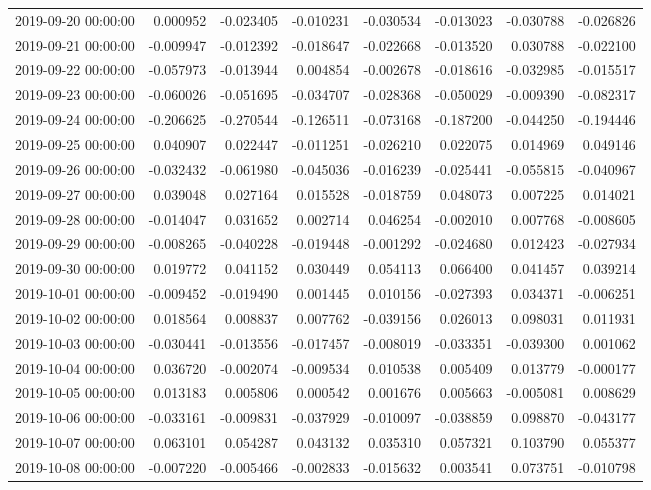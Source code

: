 \begin{tabular}{lrrrrrrr}
2019-09-20 00:00:00 & 0.000952 & -0.023405 & -0.010231 & -0.030534 & -0.013023 & -0.030788 & -0.026826 \\
2019-09-21 00:00:00 & -0.009947 & -0.012392 & -0.018647 & -0.022668 & -0.013520 & 0.030788 & -0.022100 \\
2019-09-22 00:00:00 & -0.057973 & -0.013944 & 0.004854 & -0.002678 & -0.018616 & -0.032985 & -0.015517 \\
2019-09-23 00:00:00 & -0.060026 & -0.051695 & -0.034707 & -0.028368 & -0.050029 & -0.009390 & -0.082317 \\
2019-09-24 00:00:00 & -0.206625 & -0.270544 & -0.126511 & -0.073168 & -0.187200 & -0.044250 & -0.194446 \\
2019-09-25 00:00:00 & 0.040907 & 0.022447 & -0.011251 & -0.026210 & 0.022075 & 0.014969 & 0.049146 \\
2019-09-26 00:00:00 & -0.032432 & -0.061980 & -0.045036 & -0.016239 & -0.025441 & -0.055815 & -0.040967 \\
2019-09-27 00:00:00 & 0.039048 & 0.027164 & 0.015528 & -0.018759 & 0.048073 & 0.007225 & 0.014021 \\
2019-09-28 00:00:00 & -0.014047 & 0.031652 & 0.002714 & 0.046254 & -0.002010 & 0.007768 & -0.008605 \\
2019-09-29 00:00:00 & -0.008265 & -0.040228 & -0.019448 & -0.001292 & -0.024680 & 0.012423 & -0.027934 \\
2019-09-30 00:00:00 & 0.019772 & 0.041152 & 0.030449 & 0.054113 & 0.066400 & 0.041457 & 0.039214 \\
2019-10-01 00:00:00 & -0.009452 & -0.019490 & 0.001445 & 0.010156 & -0.027393 & 0.034371 & -0.006251 \\
2019-10-02 00:00:00 & 0.018564 & 0.008837 & 0.007762 & -0.039156 & 0.026013 & 0.098031 & 0.011931 \\
2019-10-03 00:00:00 & -0.030441 & -0.013556 & -0.017457 & -0.008019 & -0.033351 & -0.039300 & 0.001062 \\
2019-10-04 00:00:00 & 0.036720 & -0.002074 & -0.009534 & 0.010538 & 0.005409 & 0.013779 & -0.000177 \\
2019-10-05 00:00:00 & 0.013183 & 0.005806 & 0.000542 & 0.001676 & 0.005663 & -0.005081 & 0.008629 \\
2019-10-06 00:00:00 & -0.033161 & -0.009831 & -0.037929 & -0.010097 & -0.038859 & 0.098870 & -0.043177 \\
2019-10-07 00:00:00 & 0.063101 & 0.054287 & 0.043132 & 0.035310 & 0.057321 & 0.103790 & 0.055377 \\
2019-10-08 00:00:00 & -0.007220 & -0.005466 & -0.002833 & -0.015632 & 0.003541 & 0.073751 & -0.010798 \\

\end{tabular}
